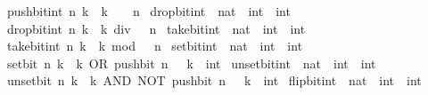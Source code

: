 \begin{isabellebody}
\ \ \ {\isacartoucheopen}push{\isacharunderscore}{\kern0pt}bit{\isacharunderscore}{\kern0pt}int\ n\ k\ {\isacharequal}{\kern0pt}\ k\ {\isacharasterisk}{\kern0pt}\ {}\ {\isacharcircum}{\kern0pt}\ n{\isacartoucheclose}\isanewline
\isanewline
{}\isamarkupfalse%
\ drop{\isacharunderscore}{\kern0pt}bit{\isacharunderscore}{\kern0pt}int\ {\isacharcolon}{\kern0pt}{\isacharcolon}{\kern0pt}\ {\isacartoucheopen}nat\ {\isasymRightarrow}\ int\ {\isasymRightarrow}\ int{\isacartoucheclose}\isanewline
\ \ \ {\isacartoucheopen}drop{\isacharunderscore}{\kern0pt}bit{\isacharunderscore}{\kern0pt}int\ n\ k\ {\isacharequal}{\kern0pt}\ k\ div\ {}\ {\isacharcircum}{\kern0pt}\ n{\isacartoucheclose}\isanewline
\isanewline
{}\isamarkupfalse%
\ take{\isacharunderscore}{\kern0pt}bit{\isacharunderscore}{\kern0pt}int\ {\isacharcolon}{\kern0pt}{\isacharcolon}{\kern0pt}\ {\isacartoucheopen}nat\ {\isasymRightarrow}\ int\ {\isasymRightarrow}\ int{\isacartoucheclose}\isanewline
\ \ \ {\isacartoucheopen}take{\isacharunderscore}{\kern0pt}bit{\isacharunderscore}{\kern0pt}int\ n\ k\ {\isacharequal}{\kern0pt}\ k\ mod\ {}\ {\isacharcircum}{\kern0pt}\ n{\isacartoucheclose}\isanewline
\isanewline
{}\isamarkupfalse%
\ set{\isacharunderscore}{\kern0pt}bit{\isacharunderscore}{\kern0pt}int\ {\isacharcolon}{\kern0pt}{\isacharcolon}{\kern0pt}\ {\isacartoucheopen}nat\ {\isasymRightarrow}\ int\ {\isasymRightarrow}\ int{\isacartoucheclose}\isanewline
\ \ \ {\isacartoucheopen}set{\isacharunderscore}{\kern0pt}bit\ n\ k\ {\isacharequal}{\kern0pt}\ k\ OR\ push{\isacharunderscore}{\kern0pt}bit\ n\ {}{\isacartoucheclose}\ \ k\ {\isacharcolon}{\kern0pt}{\isacharcolon}{\kern0pt}\ int\isanewline
\isanewline
{}\isamarkupfalse%
\ unset{\isacharunderscore}{\kern0pt}bit{\isacharunderscore}{\kern0pt}int\ {\isacharcolon}{\kern0pt}{\isacharcolon}{\kern0pt}\ {\isacartoucheopen}nat\ {\isasymRightarrow}\ int\ {\isasymRightarrow}\ int{\isacartoucheclose}\isanewline
\ \ \ {\isacartoucheopen}unset{\isacharunderscore}{\kern0pt}bit\ n\ k\ {\isacharequal}{\kern0pt}\ k\ AND\ NOT\ {\isacharparenleft}{\kern0pt}push{\isacharunderscore}{\kern0pt}bit\ n\ {}{\isacharparenright}{\kern0pt}{\isacartoucheclose}\ \ k\ {\isacharcolon}{\kern0pt}{\isacharcolon}{\kern0pt}\ int\isanewline
\isanewline
{}\isamarkupfalse%
\ flip{\isacharunderscore}{\kern0pt}bit{\isacharunderscore}{\kern0pt}int\ {\isacharcolon}{\kern0pt}{\isacharcolon}{\kern0pt}\ {\isacartoucheopen}nat\ {\isasymRightarrow}\ int\ {\isasymRightarrow}\ int{\isacartoucheclose}\isanewline

\end{isabellebody}
